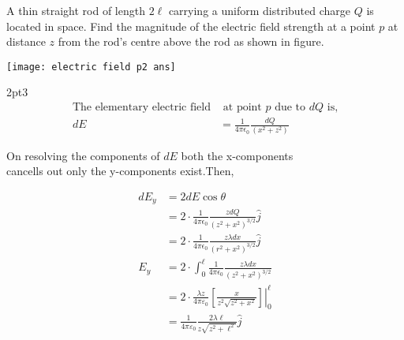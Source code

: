 \begin{exercise}
	A thin straight rod of length $2 \ell$ carrying a uniform distributed charge $Q$ is located in space. Find the magnitude of the electric field strength at a point $p$  at distance $z$ from the rod's centre above the rod as shown in figure.\newline
	
	\centering
			\texttt{[image: electric field p2 ans]}
		
\end{exercise}
\opencutright
\renewcommand\windowpagestuff{
	\centering\texttt{[image: electric field p2]}}
\begin{answer}
	\begin{cutout}{3}{\dimexpr\linewidth-4.9cm\relax}{2pt}{3}
		\begin{align*}
		\text{The elementary electric field}&\text{ at point $p$ due to $dQ$ is,}\\
		dE&=\frac{1}{4 \pi \epsilon_{0}} \frac{dQ}{(x^{2}+z^{2})}
			\end{align*}
		\end{cutout}
	On resolving the components of $dE$ both the x-components\\ cancells out only the y-components exist.Then,
	
	\begin{align*}
	dE_{y}&=2dE \cos\theta\\
	&=2\cdot\frac{1}{4 \pi \epsilon_{0}}\frac{z dQ}{(z^{2}+x^{2})^{3/2}}\hat{j}\\
	&=2\cdot\frac{1}{4 \pi \epsilon_{0}}\frac{z \lambda dx}{(r^{2}+x^{2})^{3/2}}\hat{j}\\
	E_{y}&=2\cdot\int_{0}^{\ell} \frac{1}{4 \pi \epsilon_{0}}\frac{z \lambda dx}{(z^{2}+x^{2})^{3/2}}\\
	&=2\cdot\left.\frac{ \lambda z}{4 \pi \varepsilon_{0}}\left[\frac{x}{z^{2} \sqrt{z^{2}+x^{2}}}\right]\right|_{0} ^{\ell}\\
	&=\frac{1}{4 \pi \varepsilon_{0}} \frac{2 \lambda \ell}{z \sqrt{z^{2}+\ell^{2}}} \hat{j}
	\end{align*}
\end{answer}

